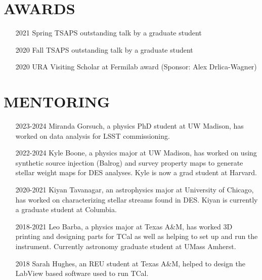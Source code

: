 \documentclass[11pt,letterpaper, sans]{moderncv}        %
\begin{document}
\section{AWARDS}
\begin{minipage}{\maincolumnwidth}%
	\small{
    	\begin{itemize}[itemsep=1pt, leftmargin=28pt]
          \item [2021] Spring TSAPS outstanding talk by a graduate student 
          \item [2020] Fall TSAPS outstanding talk by a graduate student 
          \item [2020] URA Visiting Scholar at Fermilab award (Sponsor: Alex Drlica-Wagner)
          \item []
		\end{itemize}}%
\end{minipage}%
\vspace{-4mm}      
\section{MENTORING}
\begin{itemize} [itemsep=1pt, leftmargin=65pt]
    \item [2023-2024] Miranda Gorsuch, a physics PhD student at UW Madison, has worked on data analysis for LSST commissioning.
    \item [2022-2024] Kyle Boone, a physics major at UW Madison, has worked on using synthetic source injection (Balrog) and survey property maps to generate stellar weight maps for DES analyses. Kyle is now a grad student at Harvard. 
    \item [2020-2021] Kiyan Tavanagar, an astrophysics major at University of Chicago, has worked on characterizing stellar streams found in DES. Kiyan is currently a graduate student at Columbia.   
    \item [2018-2021] Leo Barba, a physics major at Texas A\&M, has worked 3D printing and designing parts for TCal as well as helping to set up and run the instrument. Currently astronomy graduate student at UMass Amherst.  
    \item [2018] Sarah Hughes, an REU student at Texas A\&M, helped to design the LabView based software used to run TCal.  
\end{itemize}
\end{document}
